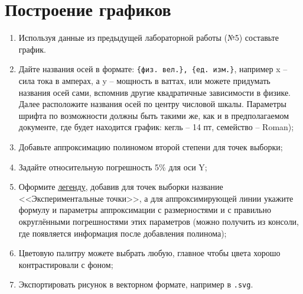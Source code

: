 \documentclass[14pt,a4paper]{article}
\begin{document}
\section{Построение графиков}
\begin{enumerate}
    \item Используя данные из предыдущей лабораторной работы (№5) составьте график. 
    \item Дайте названия осей в формате: \verb|{физ. вел.}, {ед. изм.}|, например x -- сила тока в амперах, а y -- мощность в ваттах, или можете придумать названия осей сами, вспомнив другие квадратичные зависимости в физике. Далее расположите названия осей по центру числовой шкалы. Параметры шрифта по возможности должны быть такими же, как и в предполагаемом документе, где будет находится график: кегль -- 14 пт, семейство -- Roman);
    \item Добавьте аппроксимацию полиномом второй степени для точек выборки;
    \item Задайте относительную погрешность 5\% для оси Y;
    \item Оформите \href{https://www.stimulsoft.com/ru/documentation/online/user-manual/index.html?report_internals_charts_chart_tab_legend.htm}{легенду}, добавив для точек выборки название <<Экспериментальные точки>>, а для аппроксимирующей линии укажите формулу и параметры аппроксимации с размерностями и с правильно округлёнными погрешностями этих параметров (можно получить из консоли, где появляется информация после добавления полинома);
    \item Цветовую палитру можете выбрать любую, главное чтобы цвета хорошо контрастировали с фоном;
    \item Экспортировать рисунок в векторном формате, например в \verb|.svg|.
\end{enumerate}

% 
\end{document}
